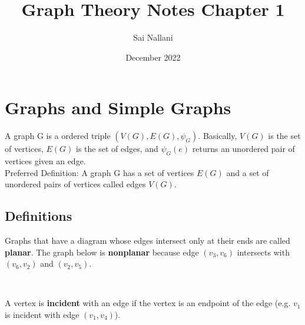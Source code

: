 \documentclass{article}
\title{Graph Theory Notes Chapter 1}
\author{Sai Nallani}
\date{December 2022}
\begin{document}
\maketitle

\section{Graphs and Simple Graphs}
A graph G is a ordered triple $(V(G), E(G), \psi_G)$. Basically,
$V(G)$ is the set of vertices, $E(G)$ is the
set of edges, and $\psi_G(e)$ returns an unordered pair of
vertices given an edge.\\
Preferred Definition: A graph G has a set of vertices $E(G)$
and a set of unordered pairs of vertices called edges $V(G)$.\\
\subsection{Definitions}
Graphs that have a diagram whose edges intersect only at their ends are
called \textbf{planar}.
The graph below is \textbf{nonplanar} because edge $(v_3, v_6)$ intersects
with $(v_6, v_2)$ and $(v_2, v_5)$.\\
\begin{center}
    \\
\end{center}
A vertex is \textbf{incident} with an edge if the vertex is an endpoint
of the edge (e.g. $v_1$ is incident with edge $(v_1, v_4)$).
\end{document}
